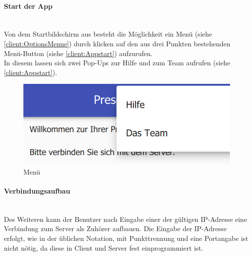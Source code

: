 \paragraph{Start der App}$\;$\\
Von dem Startbildschirm aus besteht die Möglichkeit ein Menü (siehe \autoref{client:OptionsMenue}) durch klicken auf den aus drei Punkten bestehenden Menü-Button (siehe \autoref{client:Appstart}) aufzurufen.
\\In diesem lassen sich zwei Pop-Ups zur Hilfe und zum Team aufrufen (siehe \autoref{client:Appstart}).
\begin{figure}[ht!]
	\centering
	\includegraphics[scale=0.5]{GUI/Bilder/Info-Menu.PNG}
	\caption{Menü{\tiny}}
	\label{client:OptionsMenue}
\end{figure}
\paragraph{Verbindungsaufbau}$\;$\\
Des Weiteren kann der Benutzer nach Eingabe einer der gültigen IP-Adresse eine Verbindung zum Server als Zuhörer aufbauen. Die Eingabe der IP-Adresse erfolgt, wie in der üblichen Notation, mit Punkttrennung und eine Portangabe ist nicht nötig, da diese in Client und Server fest einprogrammiert ist.

